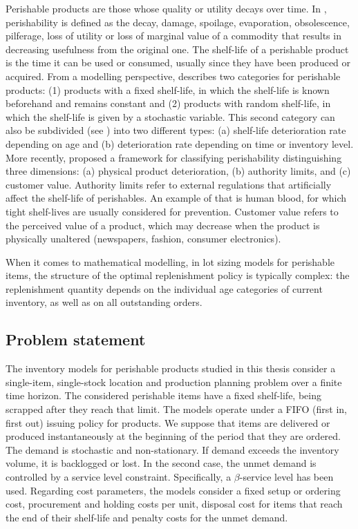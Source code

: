 Perishable products are those whose quality or utility decays over time. In
\cite{wee1993}, perishability is defined as the decay, damage, spoilage, evaporation, obsolescence, pilferage, loss of utility or loss of marginal value of a commodity that results in decreasing usefulness from the original one. The shelf-life of a perishable product is the time it can be used or consumed, usually since they have been produced or acquired.
From a modelling perspective, \cite{Nahmias82} describes two categories for perishable products: (1) products with a fixed shelf-life, in which the shelf-life is known beforehand and remains constant and (2) products with random shelf-life, in which the shelf-life is given by a stochastic variable. This second category can also be subdivided (see \cite{Bakker12}) into two different types: (a) shelf-life deterioration rate depending on age and (b) deterioration rate depending on time or inventory level. %
More recently, \cite{Amorim2013} proposed a framework for classifying perishability distinguishing three dimensions: (a) physical product deterioration, (b) authority limits, and (c) customer value. Authority limits refer to external regulations that artificially affect the shelf-life of perishables. An example of that is human blood, for which tight shelf-lives are usually considered for prevention. Customer value refers to the perceived value of a product, which may decrease when the product is physically unaltered (newspapers, fashion, consumer electronics).

When it comes to mathematical modelling, in lot sizing models for perishable items, the structure of the optimal replenishment policy is typically complex: the replenishment quantity depends on the individual age categories of current inventory, as well as on all outstanding orders. %


\subsection{Problem statement}
\label{subsec:statementperishables}
The inventory models for perishable products studied in this thesis consider a single-item, single-stock location and production planning problem over a finite time horizon. The considered perishable items have a fixed shelf-life, being scrapped after they reach that limit. The models operate under a FIFO (first in, first out) issuing policy for products. We suppose that items are delivered or produced instantaneously at the beginning of the period that they are ordered. The demand is stochastic and non-stationary. If demand exceeds the inventory volume, it is backlogged or lost. In the second case, the unmet demand is controlled by a service level constraint. Specifically, a $\beta$-service level has been used. Regarding cost parameters, the models consider a fixed setup or ordering cost, procurement and holding costs per unit, disposal cost for items that reach the end of their shelf-life and penalty costs for the unmet demand.


